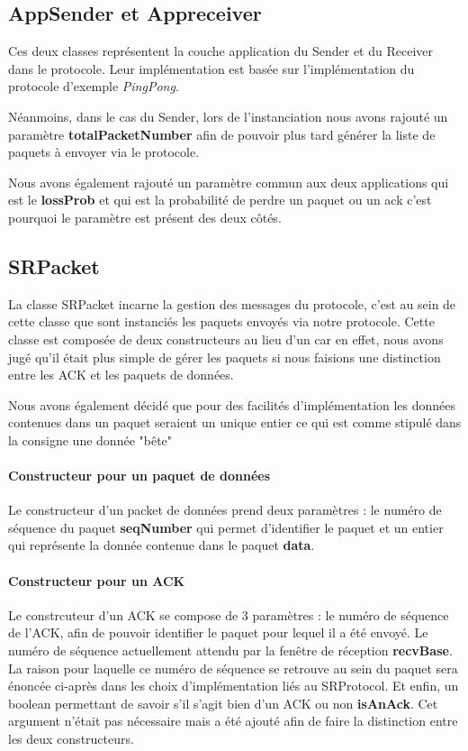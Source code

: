 \documentclass[../rapport.tex]{subfiles}
\begin{document}
\subsection{AppSender et Appreceiver}

	Ces deux classes représentent la couche application du Sender et du Receiver dans le 
	protocole. Leur implémentation est basée sur l'implémentation du protocole d'exemple 
	\textit{PingPong}. 

	\medskip

	Néanmoins, dans le cas du Sender, lors de l'instanciation nous avons rajouté
	un paramètre \textbf{totalPacketNumber} afin de pouvoir plus tard générer la liste
	de paquets à envoyer via le protocole. 

	\medskip
	Nous avons également rajouté un paramètre commun aux deux applications qui est le 
	\textbf{lossProb} et qui est la probabilité de perdre un paquet ou un ack c'est pourquoi le
	paramètre est présent des deux côtés. 


\subsection{SRPacket}

	La classe SRPacket incarne la gestion des messages du protocole, c'est au sein de cette 
	classe que sont instanciés les paquets envoyés via notre protocole. Cette classe est
	composée de deux constructeurs au lieu d'un car en effet, nous avons jugé qu'il était
	plus simple de gérer les paquets si nous faisions une distinction entre les ACK et les
	paquets de données. 

	\medskip
	Nous avons également décidé que pour des facilités d'implémentation
	les données contenues dans un paquet seraient un unique entier ce qui est comme stipulé
	dans la consigne une donnée "bête"

	\medskip

	\paragraph{Constructeur pour un paquet de données}
	Le constructeur d'un packet de données prend deux paramètres : le numéro de séquence du
	paquet \textbf{seqNumber} qui permet d'identifier le paquet et un entier qui représente
	la donnée contenue dans le paquet \textbf{data}.

	\paragraph{Constructeur pour un ACK}
	Le constrcuteur d'un ACK se compose de 3 paramètres : le numéro de séquence de l'ACK, afin
	de pouvoir identifier le paquet pour lequel il a été envoyé. Le numéro de séquence
	actuellement attendu par la fenêtre de réception \textbf{recvBase}. La raison pour laquelle
	ce numéro de séquence se retrouve au sein du paquet sera énoncée ci-après dans les choix
	d'implémentation liés au SRProtocol. Et enfin, un boolean permettant de savoir s'il s'agit
	bien d'un ACK ou non \textbf{isAnAck}.
	Cet argument n'était pas nécessaire mais a été ajouté afin de faire la distinction entre
	les deux constructeurs.
\end{document}
